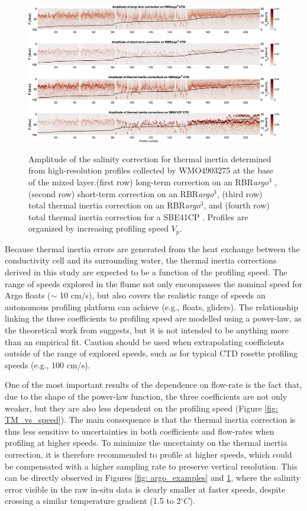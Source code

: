 \documentclass{ametsocV6.1}
\begin{document}
\begin{figure}[t]
	\centering
	\includegraphics[width=.95\linewidth]{Fig14_SBE_vs_RBR_thermal_mass}\\
	\caption{Amplitude of the salinity correction for thermal inertia determined from high-resolution profiles collected by WMO4903275 at the base of the mixed layer.(first row) long-term correction on an RBR\textit{argo}$^3$ , (second row) short-term correction on an RBR\textit{argo}$^3$, (third row) total thermal inertia correction on an RBR\textit{argo}$^3$,  and (fourth row) total thermal inertia correction for a SBE41CP \citep{Johnson_2007}. Profiles are organized by increasing profiling speed $V_p$.}
	\label{fig: TM_errors_float}
\end{figure}

Because thermal inertia errors are generated from the heat exchange between the conductivity cell and its surrounding water, the thermal inertia corrections derived in this study are expected to be a function of the profiling speed.  
The range of speeds explored in the flume not only encompasses the nominal speed for Argo floats ($\sim$ 10 cm/s), but also covers the realistic range of speeds an autonomous profiling platform can achieve (e.g., floats, gliders). 
The relationship linking the three coefficients to profiling speed are modelled using a power-law, as the theoretical work from \cite{Lueck_1990a} suggests, but it is not intended to be anything more than an empirical fit. 
Caution should be used when extrapolating coefficients outside of the range of explored speeds, such as for typical CTD rosette profiling speeds (e.g., 100 cm/s).  

One of the most important results of the dependence on flow-rate is the fact that, due to the shape of the power-law function, the three coefficients are not only weaker, but they are also less dependent on the profiling speed (Figure \ref{fig: TM_vs_speed}).
The main consequence is that the thermal inertia correction is thus less sensitive to uncertainties in both coefficients and flow-rates when profiling at higher speeds.
To minimize the uncertainty on the thermal inertia correction, it is therefore recommended to profile at higher speeds, which could be compensated with a higher sampling rate to preserve vertical resolution.
This can be directly observed in Figures \ref{fig: argo_examples} and \ref{fig: TM_errors_float}, where the salinity error visible in the raw in-situ data is clearly smaller at faster speeds, despite crossing a similar temperature gradient (1.5 to 2$^\circ C$).
\end{document}
